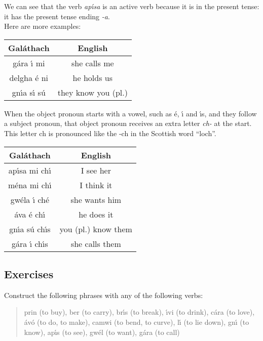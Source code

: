 \noindent We can see that the verb \textit{ap\'{\i}sa} is an active verb because it is in the present tense: it has the present tense ending \textit{-a}.\\

\noindent Here are more examples:
\begin{table}[H]
\centering
\begin{tabu}{c|c}
  \textbf{Gal\'{a}thach} & \textbf{English}\\
  \toprule
   g\'{a}ra \'{\i} mi & she calls me\\
   delgha \'{e} ni & he holds us\\
   gn\'{\i}a s\'{\i} s\'{u} & they know you (pl.)
\end{tabu}
\label{examples_verbs_vso_more_examples}
\end{table}

\noindent When the object pronoun starts with a vowel, such as \'{e}, \'{\i} and \'{\i}s, and they follow a subject pronoun, that object pronoun receives an extra letter \textit{ch-} at the start. This letter ch is pronounced like the -ch in the Scottish word ``loch''.
\begin{table}[H]
\centering
\begin{tabu}{c|c}
  \textbf{Gal\'{a}thach} & \textbf{English}\\
  \toprule
  ap\'{\i}sa mi ch\'{\i} & I see her\\
  m\'{e}na mi ch\'{\i} & I think it\\
  gw\'{e}la \'{\i} ch\'{e} & she wants him\\
  \'{a}va \'{e} ch\'{\i} & he does it\\
  gn\'{\i}a s\'{u} ch\'{\i}s & you (pl.) know them\\
  g\'{a}ra \'{\i} ch\'{\i}s & she calls them
\end{tabu}
\label{examples_verbs_vso_extra_ch}
\end{table}

\subsection{Exercises}

\noindent Construct the following phrases with any of the following verbs:

\begin{quote}
prin (to buy), ber (to carry), br\'{\i}s (to break), \'{\i}vi (to drink), c\'{a}ra (to love), \'{a}v\'{o} (to do, to make), camwi (to bend, to curve), l\'{\i} (to lie down), gn\'{\i} (to know), ap\'{\i}s (to see), gw\'{e}l (to want), g\'{a}ra (to call)
\end{quote}

